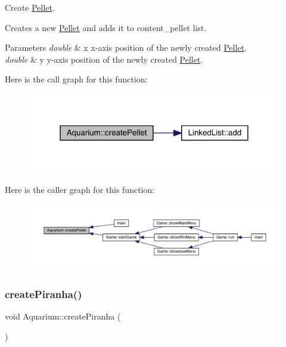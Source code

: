 Create \mbox{\hyperlink{class_pellet}{Pellet}}. 

Creates a new \mbox{\hyperlink{class_pellet}{Pellet}} and adds it to content\+\_\+pellet list. 
\begin{DoxyParams}{Parameters}
{\em double} & x x-\/axis position of the newly created \mbox{\hyperlink{class_pellet}{Pellet}}. \\
\hline
{\em double} & y y-\/axis position of the newly created \mbox{\hyperlink{class_pellet}{Pellet}}. \\
\hline
\end{DoxyParams}
Here is the call graph for this function\+:\nopagebreak
\begin{figure}[H]
\begin{center}
\leavevmode
\includegraphics[width=316pt]{class_aquarium_a049ffa77e7bbb68ac031a098c4e635e7_cgraph}
\end{center}
\end{figure}
Here is the caller graph for this function\+:
\nopagebreak
\begin{figure}[H]
\begin{center}
\leavevmode
\includegraphics[width=350pt]{class_aquarium_a049ffa77e7bbb68ac031a098c4e635e7_icgraph}
\end{center}
\end{figure}
\mbox{\label{class_aquarium_a416b16bc7c252260b9cbe053a6e5a76c}} 
\subsubsection{\texorpdfstring{create\+Piranha()}{createPiranha()}}
{\footnotesize\ttfamily void Aquarium\+::create\+Piranha (\begin{DoxyParamCaption}{ }\end{DoxyParamCaption})}



